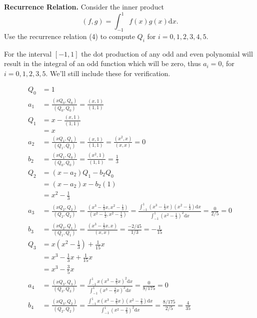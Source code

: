 \textbf{Recurrence Relation.} Consider the inner product \[(f,g) =
\int_{-1}^1 f(x) g(x) \mathrm{d}x.\] Use the recurrence relation (4)
to compute $Q_i$ for $i=0,1,2,3,4,5$.


{\color{blue}

For the interval $[-1, 1]$ the dot production of any odd and even
polynomial will result in the integral of an odd function which will
be zero, thus $a_i = 0$, for $i=0,1,2,3,5$. We'll still include these
for verification.

\begin{align*}
Q_0 &\boxed{= 1} \\
a_1 &= \frac{(x Q_0, Q_0)}{(Q_0, Q_0)} = \frac{(x,1)}{(1,1)} \\
Q_1 &= x - \frac{(x,1)}{(1,1)}\\
    &\boxed{= x} \\
a_2 &= \frac{(x Q_1, Q_1)}{(Q_1, Q_1)}
    = \frac{(x,1)}{(1,1)}
    = \frac{(x^2, x)}{(x,x)}
    = 0 \\
b_2 &=  \frac{(x Q_1, Q_0)}{(Q_0, Q_0)}
    =  \frac{(x^2, 1)}{(1,1)}
    =  \frac{1}{3} \\
Q_2 &= (x-a_2) Q_1 - b_2 Q_0 \\
    &= (x - a_2) x - b_2 (1) \\
    &\boxed{= x^2 - \frac{1}{3}} \\
a_3 &= \frac{(x Q_2, Q_2)} {(Q_2, Q_2)}
    = \frac{(x^3 - \frac{1}{3} x, x^2 - \frac{1}{3})}{(x^2 - \frac{1}{3}, x^2 - \frac{1}{3})}
    = \frac{\int_{-1}^1 (x^3 - \frac{1}{3} x) (x^2 - \frac{1}{3}) \textrm{d}x}{\int_{-1}^1 (x^2 - \frac{1}{3})^2 \textrm{d}x}
    = \frac{0}{2/5}
    = 0 \\
b_3 &= \frac{(x Q_2, Q_1)}{(Q_1, Q_1)}
    = \frac{(x^3 - \frac{1}{3}x, x)}{(x,x)}
    = \frac{-2/45}{1/3}
    = -\frac{1}{15} \\
Q_3 &= x(x^2 - \frac{1}{3}) + \frac{1}{15} x \\
    &= x^3 - \frac{1}{3} x + \frac{1}{15} x \\
    &\boxed{= x^3 - \frac{3}{5} x}\\
a_4 &= \frac{(x Q_3, Q_3)}{(Q_3, Q_3)}
    = \frac{\int_{-1}^1 x (x^3 - \frac{3}{5} x)^2 \textrm{d}x}{
    \int_{-1}^1 (x^3 - \frac{3}{5} x)^2 \textrm{d}x}
    = \frac{0}{8/175}
    = 0 \\
b_4 &= \frac{(x Q_3, Q_2)}{(Q_2, Q_2)}
    = \frac{\int_{-1}^1 x (x^3 - \frac{3}{5} x) (x^2 - \frac{2}{3}) \textrm{d}x}{\int_{-1}^1 (x^2 - \frac{2}{3})^2 \textrm{d}x}
    = \frac{8/175}{2/5}
    = \frac{4}{35} \\

\end{align*}}
